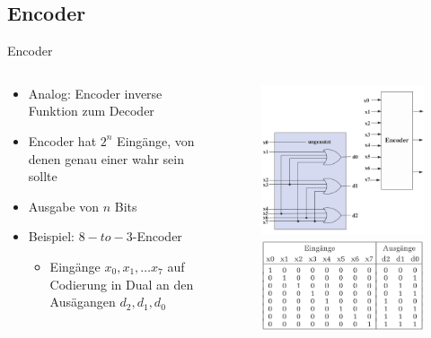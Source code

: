 \documentclass[12pt%
,xcolor=table
,aspectratio=169%
]{beamer}
\begin{document}
\subsection{Encoder}
\begin{frame}{Encoder}
\begin{columns}[T] %
\begin{column}{.58\textwidth}
\begin{itemize}
	\item Analog: Encoder inverse Funktion zum Decoder
	\item Encoder hat $2^n$ Eingänge, von denen genau einer wahr sein sollte
	\item Ausgabe von $n$ Bits
	\item Beispiel: $8-to-3$-Encoder
	\begin{itemize}
		\item Eingänge $x_0 ,x_1 , \ldots x_7$ auf Codierung in Dual an den Ausägangen $d_2 , d_1 , d_0$
	\end{itemize}
\end{itemize}
\end{column}%
\hfill%
\begin{column}{.48\textwidth}
\centering
\vspace*{-1.7cm}
\begin{figure}
\includegraphics[scale=0.3]{pictures/encoder1}\\
\includegraphics[scale=0.3]{pictures/encoder2}

\end{figure}
\end{column}
\end{columns}
\end{frame}
\end{document}
